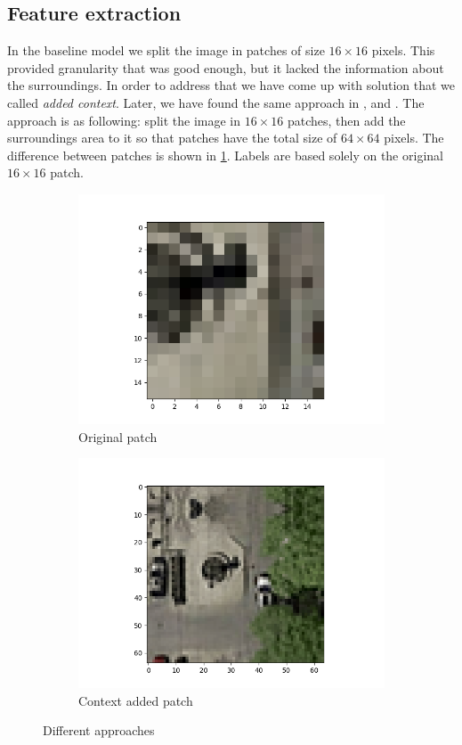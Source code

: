 \documentclass[10pt,conference,compsocconf]{IEEEtran}
\begin{document}
\subsection{Feature extraction}
\label{sec:feature}
In the baseline model we split the image in patches of size $16\times16$ pixels. This provided granularity
that was good enough, but it lacked the information about the surroundings. In order to address that we have come up
with solution that we called \textit{added context}. Later, we have found the same approach in \cite{mthesis},
\cite{Mnih2010} and \cite{eth_paper}. The approach is as following: split the image in $16\times16$ patches, then add the 
surroundings area to it so that patches have the total size of $64\times64$ pixels. The difference between patches is
shown in \ref{fig:patches}. Labels are based solely on the original $16\times16$ patch. 

\begin{figure}
\centering
\begin{subfigure}{.5\columnwidth}
  \centering
  \includegraphics[width=.8\linewidth]{orig_patch.png}
  \caption{Original patch}
\end{subfigure}%
\begin{subfigure}{.5\columnwidth}
  \centering
  \includegraphics[width=\linewidth]{cont_added_patch.png}
  \caption{Context added patch}
\end{subfigure}
\caption{Different approaches}
\label{fig:patches}
\end{figure}
\end{document}
